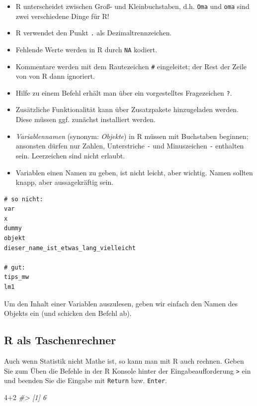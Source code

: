 \documentclass[12pt,ngerman,]{book}
\makeatletter
\newenvironment{Shaded}{\begin{snugshade}}{\end{snugshade}}
\newcommand{\DecValTok}[1]{\textcolor[rgb]{0.00,0.00,0.81}{{#1}}}
\newcommand{\CommentTok}[1]{\textcolor[rgb]{0.56,0.35,0.01}{\textit{{#1}}}}
\providecommand{\tightlist}{%
  \setlength{\itemsep}{0pt}\setlength{\parskip}{0pt}}
\newenvironment{kframe}{%
\medskip{}
\setlength{\fboxsep}{.8em}
 \def\at@end@of@kframe{}%
 \ifinner\ifhmode%
  \def\at@end@of@kframe{\end{minipage}}%
  \begin{minipage}{\columnwidth}%
 \fi\fi%
 \def\FrameCommand##1{\hskip\@totalleftmargin \hskip-\fboxsep
 \colorbox{shadecolor}{##1}\hskip-\fboxsep
     \hskip-\linewidth \hskip-\@totalleftmargin \hskip\columnwidth}%
 \MakeFramed {\advance\hsize-\width
   \@totalleftmargin\z@ \linewidth\hsize
   \@setminipage}}%
 {\par\unskip\endMakeFramed%
 \at@end@of@kframe}
\renewenvironment{Shaded}{\begin{kframe}}{\end{kframe}}
\makeatother
\begin{document}
\begin{itemize}
\tightlist
\item
  R unterscheidet zwischen Groß- und Kleinbuchstaben, d.h. \texttt{Oma}
  und \texttt{oma} sind zwei verschiedene Dinge für R!
\item
  R verwendet den Punkt \texttt{.} als Dezimaltrennzeichen.
\item
  Fehlende Werte werden in R durch \texttt{NA} kodiert.
\item
  Kommentare werden mit dem Rautezeichen \texttt{\#} eingeleitet; der
  Rest der Zeile von von R dann ignoriert.
\item
  Hilfe zu einem Befehl erhält man über ein vorgestelltes Fragezeichen
  \texttt{?}.
\item
  Zusätzliche Funktionalität kann über Zusatzpakete hinzugeladen werden.
  Diese müssen ggf. zunächst installiert werden.
\item
  \emph{Variablennamen} (synonym:
  \emph{Objekte}) in R müssen mit Buchstaben beginnen;
  ansonsten dürfen nur Zahlen, Unterstriche \texttt{-} und Minuszeichen
  \texttt{-} enthalten sein. Leerzeichen sind nicht erlaubt.
\item
  Variablen einen Namen zu geben, ist nicht leicht, aber wichtig. Namen
  sollten knapp, aber aussagekräftig sein.
\end{itemize}

\begin{verbatim}
# so nicht:
var
x
dummy
objekt
dieser_name_ist_etwas_lang_vielleicht

# gut:
tips_mw
lm1
\end{verbatim}

Um den Inhalt einer Variablen auszulesen, geben wir einfach den Namen
des Objekts ein (und schicken den Befehl ab).

\subsection{R als Taschenrechner}\label{r-als-taschenrechner}

Auch wenn Statistik nicht Mathe ist, so kann man mit R auch rechnen.
Geben Sie zum Üben die Befehle in der R Konsole hinter der
Eingabeaufforderung \texttt{\textgreater{}} ein und beenden Sie die
Eingabe mit \texttt{Return} bzw. \texttt{Enter}.

\begin{Shaded}
\begin{Highlighting}[]
\DecValTok{4+2} 
\CommentTok{#> [1] 6}
\end{Highlighting}
\end{Shaded}
\end{document}
